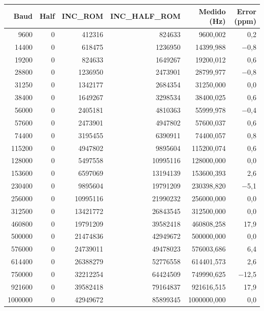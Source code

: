 \begin{table}[H]
    \centering
    \small
    \begin{tabular}{rrrrrr}
        \hline
        \textbf{Baud} & \textbf{Half} & \textbf{INC\_ROM} & \textbf{INC\_HALF\_ROM} & \textbf{Medido (Hz)} & \textbf{Error (ppm)} \\
        \hline
        9600   & 0 & 412316    & 824633    & 9600,002    & 0,2 \\
        14400  & 0 & 618475    & 1236950   & 14399,988   & $-$0,8 \\
        19200  & 0 & 824633    & 1649267   & 19200,012   & 0,6 \\
        28800  & 0 & 1236950   & 2473901   & 28799,977   & $-$0,8 \\
        31250  & 0 & 1342177   & 2684354   & 31250,000   & 0,0 \\
        38400  & 0 & 1649267   & 3298534   & 38400,025   & 0,6 \\
        56000  & 0 & 2405181   & 4810363   & 55999,978   & $-$0,4 \\
        57600  & 0 & 2473901   & 4947802   & 57600,037   & 0,6 \\
        74400  & 0 & 3195455   & 6390911   & 74400,057   & 0,8 \\
        115200 & 0 & 4947802   & 9895604   & 115200,074  & 0,6 \\
        128000 & 0 & 5497558   & 10995116  & 128000,000  & 0,0 \\
        153600 & 0 & 6597069   & 13194139  & 153600,393  & 2,6 \\
        230400 & 0 & 9895604   & 19791209  & 230398,820  & $-$5,1 \\
        256000 & 0 & 10995116  & 21990232  & 256000,000  & 0,0 \\
        312500 & 0 & 13421772  & 26843545  & 312500,000  & 0,0 \\
        460800 & 0 & 19791209  & 39582418  & 460808,258  & 17,9 \\
        500000 & 0 & 21474836  & 42949672  & 500000,000  & 0,0 \\
        576000 & 0 & 24739011  & 49478023  & 576003,686  & 6,4 \\
        614400 & 0 & 26388279  & 52776558  & 614401,573  & 2,6 \\
        750000 & 0 & 32212254  & 64424509  & 749990,625  & $-$12,5 \\
        921600 & 0 & 39582418  & 79164837  & 921616,515  & 17,9 \\
        1000000 & 0 & 42949672 & 85899345  & 1000000,000 & 0,0 \\

\end{tabular}
\end{table}
